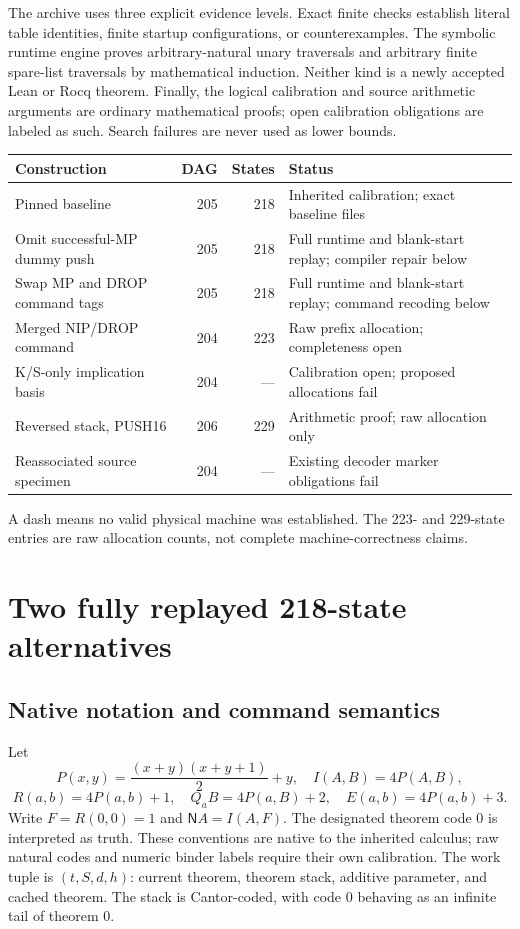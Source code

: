 \documentclass[11pt]{article}
\newcommand{\N}{\mathsf N}
\begin{document}
The archive uses three explicit evidence levels. Exact finite checks establish
literal table identities, finite startup configurations, or counterexamples.
The symbolic runtime engine proves arbitrary-natural unary traversals and
arbitrary finite spare-list traversals by mathematical induction. Neither
kind is a newly accepted Lean or Rocq theorem. Finally, the logical calibration
and source arithmetic arguments are ordinary mathematical proofs; open
calibration obligations are labeled as such. Search failures are never used
as lower bounds.

\begin{center}
\small
\begin{tabular}{p{57mm}rrp{57mm}}
\toprule
Construction & DAG & States & Status\\
\midrule
Pinned baseline &205&218&Inherited calibration; exact baseline files\\
Omit successful-MP dummy push &205&218&Full runtime and blank-start replay; compiler repair below\\
Swap MP and DROP command tags &205&218&Full runtime and blank-start replay; command recoding below\\
Merged NIP/DROP command &204&223&Raw prefix allocation; completeness open\\
K/S-only implication basis &204&---&Calibration open; proposed allocations fail\\
Reversed stack, PUSH16 &206&229&Arithmetic proof; raw allocation only\\
Reassociated source specimen &204&---&Existing decoder marker obligations fail\\
\bottomrule
\end{tabular}
\end{center}
A dash means no valid physical machine was established. The 223- and 229-state
entries are raw allocation counts, not complete machine-correctness claims.

\section{Two fully replayed 218-state alternatives}
\subsection{Native notation and command semantics}
Let
\[
 P(x,y)=\frac{(x+y)(x+y+1)}2+y,
\quad I(A,B)=4P(A,B),
\]
\[
 R(a,b)=4P(a,b)+1,\quad Q_aB=4P(a,B)+2,\quad E(a,b)=4P(a,b)+3.
\]
Write $F=R(0,0)=1$ and $\N A=I(A,F)$. The designated theorem code 0 is
interpreted as truth. These conventions are native to the inherited calculus;
raw natural codes and numeric binder labels require their own calibration.
The work tuple is $(t,S,d,h)$: current theorem, theorem stack, additive
parameter, and cached theorem. The stack is Cantor-coded, with code 0 behaving
as an infinite tail of theorem 0.
\end{document}
